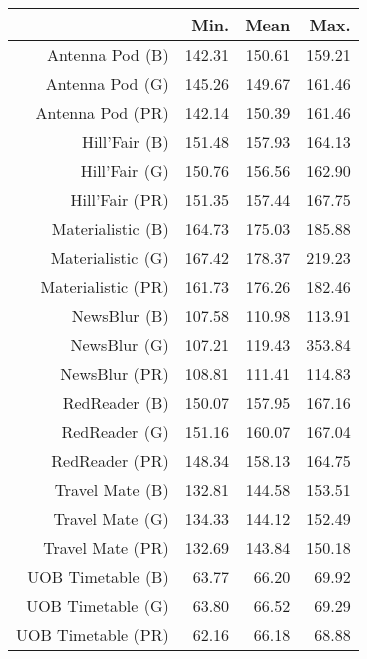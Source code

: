 \begin{table}[ht]
\centering
\begin{tabular}{rrrr}
  \hline
 & Min. & Mean & Max. \\ 
  \hline
Antenna Pod (B) & 142.31 & 150.61 & 159.21 \\ 
  Antenna Pod (G) & 145.26 & 149.67 & 161.46 \\ 
  Antenna Pod (PR) & 142.14 & 150.39 & 161.46 \\ 
  Hill'Fair (B) & 151.48 & 157.93 & 164.13 \\ 
  Hill'Fair (G) & 150.76 & 156.56 & 162.90 \\ 
  Hill'Fair (PR) & 151.35 & 157.44 & 167.75 \\ 
  Materialistic (B) & 164.73 & 175.03 & 185.88 \\ 
  Materialistic (G) & 167.42 & 178.37 & 219.23 \\ 
  Materialistic (PR) & 161.73 & 176.26 & 182.46 \\ 
  NewsBlur (B) & 107.58 & 110.98 & 113.91 \\ 
  NewsBlur (G) & 107.21 & 119.43 & 353.84 \\ 
  NewsBlur (PR) & 108.81 & 111.41 & 114.83 \\ 
  RedReader (B) & 150.07 & 157.95 & 167.16 \\ 
  RedReader (G) & 151.16 & 160.07 & 167.04 \\ 
  RedReader (PR) & 148.34 & 158.13 & 164.75 \\ 
  Travel Mate (B) & 132.81 & 144.58 & 153.51 \\ 
  Travel Mate (G) & 134.33 & 144.12 & 152.49 \\ 
  Travel Mate (PR) & 132.69 & 143.84 & 150.18 \\ 
  UOB Timetable (B) & 63.77 & 66.20 & 69.92 \\ 
  UOB Timetable (G) & 63.80 & 66.52 & 69.29 \\ 
  UOB Timetable (PR) & 62.16 & 66.18 & 68.88 \\ 
   \hline
\end{tabular}
\end{table}
